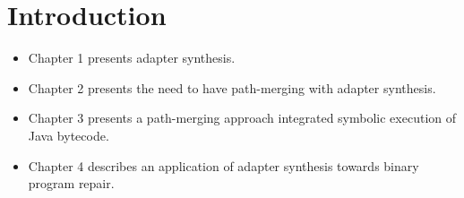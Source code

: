 \chapter{Introduction}
\label{intro_chapter}

\begin{itemize}

\item Chapter 1 presents adapter synthesis.

\item Chapter 2 presents the need to have path-merging with adapter synthesis.

\item Chapter 3 presents a path-merging approach integrated symbolic execution of Java bytecode.

\item Chapter 4 describes an application of adapter synthesis towards binary program repair.

\end{itemize}
